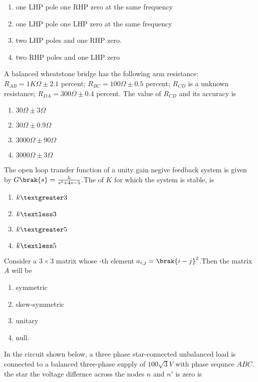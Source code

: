 \begin{enumerate}
    \item one LHP pole one RHP zero at the same frequency  
    \item one LHP pole one LHP zero at the same frequency
    \item two LHP poles and one RHP zero.
    \item two RHP poles and one LHP zero
\end{enumerate}
\item A balanced wheatstone bridge has the following arm resistance:\\
$R_{AB}=1K\Omega \pm 2.1$ percent; $R_{BC}=100\Omega \pm 0.5$ percent; $R_{CD}$ is a unknown resistance; $R_{DA}=300\Omega \pm 0.4$ percent. The value of $R_{CD}$ and its accuracy is 
\begin{enumerate}
    \item $30\Omega \pm 3\Omega$
    \item $30\Omega \pm 0.9\Omega$
    \item $3000\Omega \pm 90\Omega$
    \item $3000\Omega \pm 3\Omega$
\end{enumerate}
\item The open loop transfer function of a unity gain negive feedback system is given by $G\brak{s}=\frac{k}{s^2+4s-5}$.The of $K$ for which the system is stable, is 
\begin{enumerate}
    \item $k\textgreater 3$
    \item $k\textless 3$
    \item $k\textgreater 5$
    \item $k\textless 5$
\end{enumerate}
\item Consider a $3 \times 3$ matrix whose -th element $a_{i,j}=\brak{i-j}^2$.Then the matrix $A$ will be 
\begin{enumerate}
    \item symmetric
    \item skew-symmetric
    \item unitary
    \item null.
\end{enumerate}
\item In the circuit shown below, a three phase star-connected unbalanced load is connected to a balanced three-phase supply of $100\sqrt{3}V$ with phase sequnce $ABC$. the star the voltage differnce across the nodes $n$ and $n\prime$ is zero is  \\\\\\
